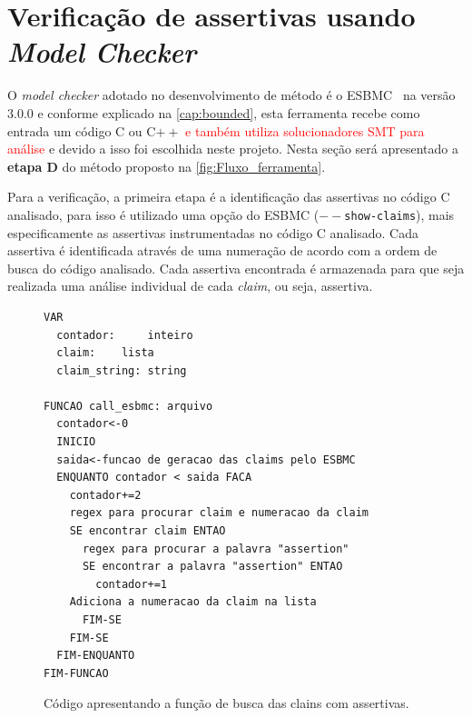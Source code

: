 \section{Verificação de assertivas usando \textit{Model Checker}}

\par
O \textit{model checker} adotado no desenvolvimento de método é o ESBMC~\cite{cordeiro2012smt} na versão $3.0.0$ e conforme explicado na \autoref{cap:bounded}, esta ferramenta recebe como entrada um código C ou C$++$ \textcolor{red}{e também utiliza solucionadores SMT para análise} e devido a isso foi escolhida neste projeto. Nesta seção será apresentado a \textbf{etapa D} do método proposto na \autoref{fig:Fluxo_ferramenta}.

\par
Para a verificação, a primeira etapa é a identificação das assertivas no código C analisado, para isso é utilizado uma opção do ESBMC (\texttt{$--$show-claims}), mais especificamente as assertivas instrumentadas no código C analisado. Cada assertiva é identificada através de uma numeração de acordo com a ordem de busca do código analisado. Cada assertiva encontrada é armazenada para que seja realizada uma análise individual de cada \textit{claim}, ou seja,  assertiva.


\begin{figure}[H]
\caption{\label{fig:codigo_claims} Código apresentando a função de busca das clains com assertivas.}
	\begin{center}
    \begin{minipage}{0.99\textwidth}
    \begin{lstlisting}       
VAR
  contador: 	inteiro
  claim: 	lista
  claim_string: string 

FUNCAO call_esbmc: arquivo
  contador<-0
  INICIO
  saida<-funcao de geracao das claims pelo ESBMC
  ENQUANTO contador < saida FACA
    contador+=2
    regex para procurar claim e numeracao da claim
    SE encontrar claim ENTAO
      regex para procurar a palavra "assertion"
      SE encontrar a palavra "assertion" ENTAO
        contador+=1
	Adiciona a numeracao da claim na lista
      FIM-SE
    FIM-SE
  FIM-ENQUANTO
FIM-FUNCAO
    \end{lstlisting}
    \end{minipage}
	\end{center}
\end{figure}

